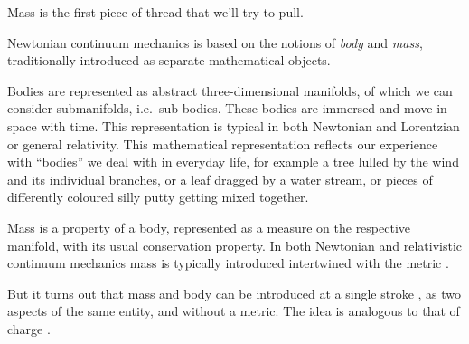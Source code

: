 \documentclass[\ifafour a4paper,12pt,\else a5paper,10pt,\fi%
onecolumn,oneside,article,%
british%
]{memoir}
\theoremstyle{remark}
\theoremstyle{innote}
\newcommand*{\citep}{\parencites}
\renewcommand*{\cites}{\parencites}
\renewcommand*{\|}{\nonscript\,\vert\nonscript\;\mathopen{}}
\newcommand*{\sect}{\S}%
\newcommand*{\sects}{\S\S}%
\newcommand*{\chap}{ch.}%
\newcommand*{\ie}{{i.e.}}
\newcommand*{\cf}{{cf.}}
\begin{document}
Mass is the first piece of thread that we'll try to pull. 

\medskip

Newtonian continuum mechanics is based on the notions of \emph{body} and
\emph{mass}, traditionally introduced as separate mathematical objects.

Bodies are represented as abstract three-dimensional manifolds, of which we
can consider submanifolds, \ie\ sub-bodies. These bodies are immersed and
move in space with time. This representation is typical in both Newtonian
\cites[\sects~I.2--3]{truesdell1977_r1991}{noll1959,noll1973} and
Lorentzian or general \citep{grotetal1966,carteretal1972} relativity. This
mathematical representation reflects our experience with \enquote{bodies}
we deal with in everyday life, for example a tree lulled by the wind and
its individual branches, or a leaf dragged by a water stream, or pieces of
differently coloured silly putty getting mixed together.

Mass is a property of a body, represented as a measure on the respective
manifold, with its usual conservation property. In both Newtonian
\cites[\sects~I.4]{truesdell1977_r1991}{noll1959,noll1973} and relativistic
\cites{grotetal1966}[\chap~3]{rezzollaetal2013} continuum mechanics mass is
typically introduced intertwined with the metric \citep[being an
exception]{carteretal1972}.

But it turns out that mass and body can be introduced at a single stroke
\citep[\cf][]{carteretal1972}, as two aspects of the same entity, and
without a metric. The idea is analogous to that of charge
\cites{burke1983,bossavit1998b,hehletal2000}[\sect~B.1]{hehletal2003}.
\end{document}
